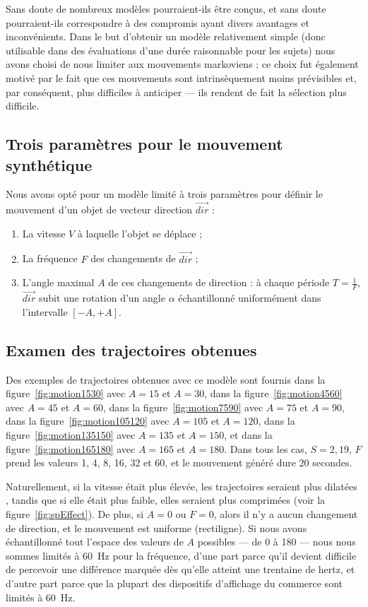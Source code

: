 	Sans doute de nombreux modèles pourraient-ils être conçus, et sans doute pourraient-ils correspondre à des compromis ayant divers avantages et inconvénients. Dans le but d'obtenir un modèle relativement simple (donc utilisable dans des évaluations d'une durée raisonnable pour les sujets) nous avons choisi de nous limiter aux mouvements markoviens ; ce choix fut également motivé par le fait que ces mouvements sont intrinsèquement moins prévisibles et, par conséquent, plus difficiles à anticiper --- ils rendent de fait la sélection plus difficile.
	
	\subsection{Trois paramètres pour le mouvement synthétique}
	Nous avons opté pour un modèle limité à trois paramètres pour définir le mouvement d'un objet de vecteur direction $\vec{dir}$ :
	\begin{enumerate}
		\item La vitesse $V$ à laquelle l'objet se déplace ;
		\item La fréquence $F$ des changements de $\vec{dir}$ ;
		\item L'angle maximal $A$ de ces changements de direction : à chaque période $T = \frac{1}{F}$, $\vec{dir}$ subit une rotation d'un angle $\alpha$ échantillonné uniformément dans l'intervalle $[-A, +A]$.
	\end{enumerate}
	
	\subsection{Examen des trajectoires obtenues}
	Des exemples de trajectoires obtenues avec ce modèle sont fournis dans la figure~\ref{fig:motion1530} avec $A=15$ et $A=30$, dans la figure~\ref{fig:motion4560} avec $A=45$ et $A=60$, dans la figure~\ref{fig:motion7590} avec $A=75$ et $A=90$, dans la figure~\ref{fig:motion105120} avec $A=105$ et $A=120$, dans la figure~\ref{fig:motion135150} avec $A=135$ et $A=150$, et dans la figure~\ref{fig:motion165180} avec $A=165$ et $A=180$. Dans tous les cas, $S=2,19$, $F$ prend les valeurs 1, 4, 8, 16, 32 et 60, et le mouvement généré dure 20 secondes.
	
	Naturellement, si la vitesse était plus élevée, les trajectoires seraient plus \og dilatées \fg{}, tandis que si elle était plus faible, elles seraient plus \og comprimées \fg{} (voir la figure~\ref{fig:spEffect}). De plus, si $A=0$ ou $F=0$, alors il n'y a aucun changement de direction, et le mouvement est uniforme (rectiligne). Si nous avons échantillonné tout l'espace des valeurs de $A$ possibles --- de 0 à 180\textdegree{} --- nous nous sommes limités à 60~Hz pour la fréquence, d'une part parce qu'il devient difficile de percevoir une différence marquée dès qu'elle atteint une trentaine de hertz, et d'autre part parce que la plupart des dispositifs d'affichage du commerce sont limités à 60~Hz.	
	
